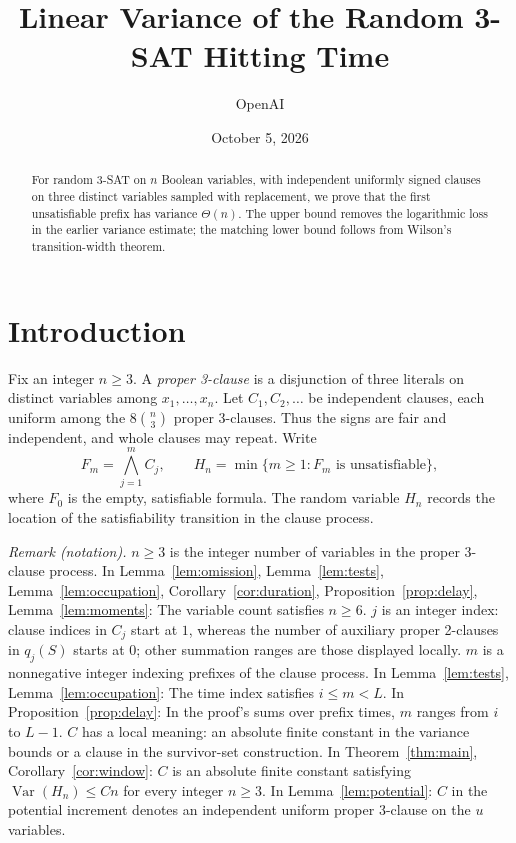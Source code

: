 \documentclass[11pt]{article}
\title{Linear Variance of the Random 3-SAT Hitting Time}
\author{OpenAI}
\date{October 5, 2026}
\theoremstyle{remark}
\newcommand{\Var}{\operatorname{Var}}
\numberwithin{equation}{section}
\begin{document}
\maketitle

\begin{abstract}
For random 3-SAT on $n$ Boolean variables, with independent uniformly
signed clauses on three distinct variables sampled with replacement,
we prove that the first unsatisfiable prefix has variance $\Theta(n)$.
The upper bound removes the logarithmic loss in the earlier variance estimate;
the matching lower bound follows from Wilson's transition-width theorem.
\end{abstract}

\section{Introduction}
\label{sec:intro}

Fix an integer $n\ge3$. A \emph{proper 3-clause} is a disjunction of three
literals on distinct variables among $x_1,\ldots,x_n$. Let
$C_1,C_2,\ldots$ be independent clauses, each uniform among the
$8\binom n3$ proper 3-clauses. Thus the signs are fair and independent,
and whole clauses may repeat. Write
\[
 F_m=\bigwedge_{j=1}^m C_j,\qquad
 H_n=\min\{m\ge1:F_m\text{ is unsatisfiable}\},
\]
where $F_0$ is the empty, satisfiable formula. The random variable $H_n$
records the location of the satisfiability transition in the clause process.

\noindent\textit{Remark (notation).} $n\ge3$ is the integer number of variables in the proper 3-clause process. In Lemma~\ref{lem:omission}, Lemma~\ref{lem:tests}, Lemma~\ref{lem:occupation}, Corollary~\ref{cor:duration}, Proposition~\ref{prop:delay}, Lemma~\ref{lem:moments}: The variable count satisfies $n\ge6$. $j$ is an integer index: clause indices in $C_j$ start at $1$, whereas the number of auxiliary proper 2-clauses in $q_j(S)$ starts at $0$; other summation ranges are those displayed locally. $m$ is a nonnegative integer indexing prefixes of the clause process. In Lemma~\ref{lem:tests}, Lemma~\ref{lem:occupation}: The time index satisfies $i\le m<L$. In Proposition~\ref{prop:delay}: In the proof's sums over prefix times, $m$ ranges from $i$ to $L-1$. $C$ has a local meaning: an absolute finite constant in the variance bounds or a clause in the survivor-set construction. In Theorem~\ref{thm:main}, Corollary~\ref{cor:window}: $C$ is an absolute finite constant satisfying $\Var(H_n)\le Cn$ for every integer $n\ge3$. In Lemma~\ref{lem:potential}: $C$ in the potential increment denotes an independent uniform proper 3-clause on the $u$ variables.
\end{document}
